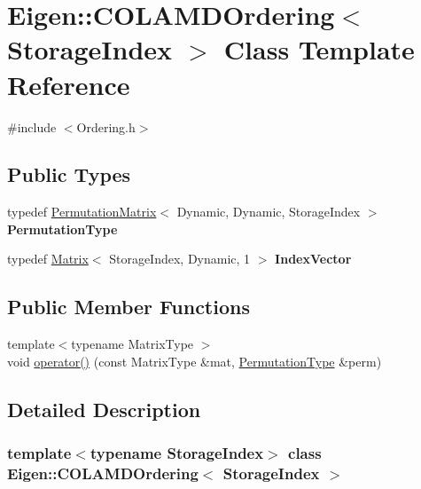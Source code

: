 \hypertarget{class_eigen_1_1_c_o_l_a_m_d_ordering}{}\section{Eigen\+::C\+O\+L\+A\+M\+D\+Ordering$<$ Storage\+Index $>$ Class Template Reference}
\label{class_eigen_1_1_c_o_l_a_m_d_ordering}


{\ttfamily \#include $<$Ordering.\+h$>$}

\subsection*{Public Types}
\begin{DoxyCompactItemize}
\item 
\mbox{\label{class_eigen_1_1_c_o_l_a_m_d_ordering_afedad7a4b7f0f018787dc8f977cdd674}} 
typedef \mbox{\hyperlink{class_eigen_1_1_permutation_matrix}{Permutation\+Matrix}}$<$ Dynamic, Dynamic, Storage\+Index $>$ {\bfseries Permutation\+Type}
\item 
\mbox{\label{class_eigen_1_1_c_o_l_a_m_d_ordering_a9b6ec654523903abaa7daf8e669b0daa}} 
typedef \mbox{\hyperlink{class_eigen_1_1_matrix}{Matrix}}$<$ Storage\+Index, Dynamic, 1 $>$ {\bfseries Index\+Vector}
\end{DoxyCompactItemize}
\subsection*{Public Member Functions}
\begin{DoxyCompactItemize}
\item 
{\footnotesize template$<$typename Matrix\+Type $>$ }\\void \mbox{\hyperlink{class_eigen_1_1_c_o_l_a_m_d_ordering_a708cb20191dcd79856d922f262405946}{operator()}} (const Matrix\+Type \&mat, \mbox{\hyperlink{class_eigen_1_1_permutation_matrix}{Permutation\+Type}} \&perm)
\end{DoxyCompactItemize}


\subsection{Detailed Description}
\subsubsection*{template$<$typename Storage\+Index$>$\newline
class Eigen\+::\+C\+O\+L\+A\+M\+D\+Ordering$<$ Storage\+Index $>$}


